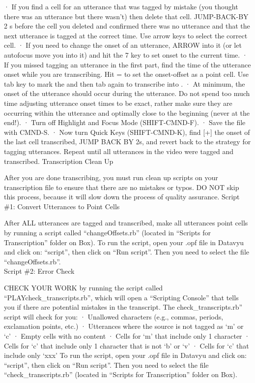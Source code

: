 \documentclass[
]{book}
\begin{document}
· If you find a cell for an utterance that was tagged by mistake (you thought there was an utterance but there wasn't) then delete that cell. JUMP-BACK-BY 2 s before the cell you deleted and confirmed there was no utterance and that the next utterance is tagged at the correct time. Use arrow keys to select the correct cell.
· If you need to change the onset of an utterance, ARROW into it (or let autofocus move you into it) and hit the 7 key to set onset to the current time.
· If you missed tagging an utterance in the first part, find the time of the utterance onset while you are transcribing. Hit = to set the onset-offset as a point cell. Use tab key to mark the and then tab again to transcribe into .
· At minimum, the onset of the utterance should occur during the utterance. Do not spend too much time adjusting utterance onset times to be exact, rather make sure they are occurring within the utterance and optimally close to the beginning (never at the end!).
· Turn off Highlight and Focus Mode (SHIFT-CMND-F).
· Save the file with CMND-S.
· Now turn Quick Keys (SHIFT-CMND-K), find {[}+{]} the onset of the last cell transcribed, JUMP BACK BY 2s, and revert back to the strategy for tagging utterances.
Repeat until all utterances in the video were tagged and transcribed.
Transcription Clean Up

After you are done transcribing, you must run clean up scripts on your transcription file to ensure that there are no mistakes or typos. DO NOT skip this process, because it will slow down the process of quality assurance.
Script \#1: Convert Utterances to Point Cells

After ALL utterances are tagged and transcribed, make all utterances point cells by running a script called ``changeOffsets.rb'' (located in ``Scripts for Transcription'' folder on Box).
To run the script, open your .opf file in Datavyu and click on: ``script'', then click on ``Run script''. Then you need to select the file ``changeOffsets.rb''.\\
Script \#2: Error Check

CHECK YOUR WORK by running the script called ``PLAYcheck\_transcripts.rb'', which will open a ``Scripting Console'' that tells you if there are potential mistakes in the transcript.
The check\_transcripts.rb'' script will check for you:
· Unallowed characters (e.g., commas, periods, exclamation points, etc.)
· Utterances where the source is not tagged as `m' or `c'
· Empty cells with no content
· Cells for `m' that include only 1 character
· Cells for `c' that include only 1 character that is not `b' or `v'
· Cells for `c' that include only `xxx'
To run the script, open your .opf file in Datavyu and click on: ``script'', then click on ``Run script''. Then you need to select the file ``check\_transcripts.rb'' (located in ``Scripts for Transcription'' folder on Box).
\end{document}
